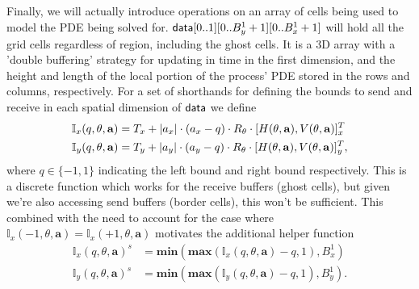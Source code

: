 Finally, we will actually introduce operations on an array of cells being used
to model the PDE being solved for.  $\textup{\textsf{data}}[0..1][0..B_y^1+1][0..B_x^1+1]$ will
hold all the grid cells regardless of region, including the ghost cells.  It
is a 3D array with a 'double buffering' strategy for updating in time
in the first dimension, and the height and length of the local portion
of the process' PDE stored in the rows and columns, respectively.  For
 a set of shorthands for defining the bounds to send and receive in
 each spatial dimension of $\textup{\textsf{data}}$ we define
\begin{eqnarray}
    \mathbb{I}_x(q, \theta,\mathbf{a}) &= T_x + |a_x|\cdot (a_x - q) \cdot R_{\theta} \cdot [H(\theta,\mathbf{a}),V(\theta,\mathbf{a})]^T_x\\
    \mathbb{I}_y(q, \theta,\mathbf{a}) &= T_y + |a_y|\cdot (a_y - q) \cdot R_{\theta} \cdot [H(\theta,\mathbf{a}),V(\theta,\mathbf{a})]^T_y,
\end{eqnarray}
where $q\in \{-1, 1\}$ indicating the left bound and right bound respectively.
This is a discrete function which works for the receive buffers (ghost cells), but given
we're also accessing send buffers (border cells), this won't be sufficient.
This combined with the need to account for the case where
$\mathbb{I}_x(-1,\theta,\mathbf{a}) = \mathbb{I}_x(+1,\theta,\mathbf{a})$ motivates
the additional helper function
\begin{eqnarray}
    \mathbb{I}_x(q,\theta,\mathbf{a})^s &= \textbf{min}(\textbf{max}(\mathbb{I}_x(q,\theta,\mathbf{a})-q,1),B_x^1)\\
    \mathbb{I}_y(q,\theta,\mathbf{a})^s &= \textbf{min}(\textbf{max}(\mathbb{I}_y(q,\theta,\mathbf{a})-q,1),B_y^1).
\end{eqnarray}